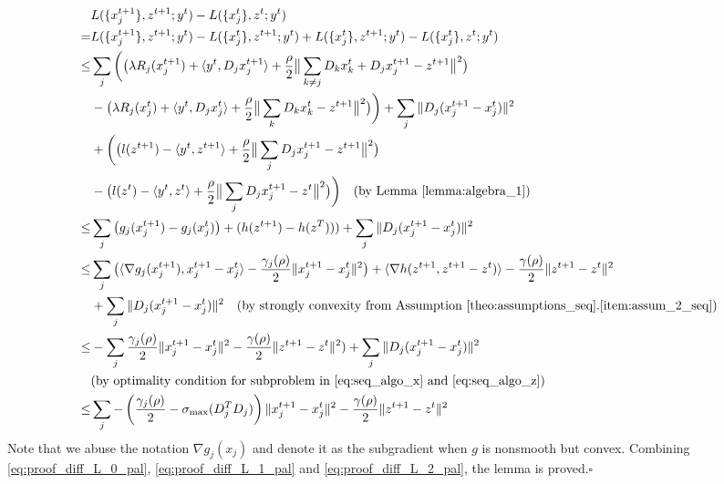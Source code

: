 \begin{align}
    & L(\{x_j^{t+1}\},z^{t+1};y^{t}) - L(\{x_j^{t}\},z^{t};y^{t})\nonumber\\
    = & L(\{x_j^{t+1}\},z^{t+1};y^{t}) - L(\{x_j^{t}\},z^{t+1};y^{t}) + L(\{x_j^{t}\},z^{t+1};y^{t}) - L(\{x_j^{t}\},z^{t};y^{t})\nonumber\\
    \le & \sum_j\bigg(\big(\lambda R_j(x_j^{t+1}) + \langle y^t, D_jx_j^{t+1}\rangle + \frac{\rho}{2}\big\|\sum_{k\neq j}D_kx_k^{t} + D_jx_j^{t+1} - z^{t+1}\big\|^2\big)\nonumber\\
    & - \big(\lambda R_j(x_j^{t}) + \langle y^t, D_jx_j^{t}\rangle + \frac{\rho}{2}\big\|\sum_{k}D_kx_k^{t} - z^{t+1}\big\|^2\big)\bigg)+\sum_j\|D_j(x_j^{t+1} - x_j^t)\|^2\nonumber\\
    & + \bigg(\big(l(z^{t+1}) -\langle y^t, z^{t+1}\rangle + \frac{\rho}{2} \big\|\sum_jD_jx_j^{t+1} - z^{t+1}\big\|^2\big)\nonumber\\
    & -\big(l(z^{t}) -\langle y^t, z^{t}\rangle+ \frac{\rho}{2} \big\|\sum_jD_jx_j^{t+1} - z^{t}\big\|^2\big)\bigg)\quad\text{(by Lemma~\ref{lemma:algebra_1})}\\
    \le & \sum_j\big(g_j(x_j^{t+1}) - g_j(x_j^t)\big) + (h(z^{t+1}) - h(z^T)))+\sum_j\|D_j(x_j^{t+1} - x_j^t)\|^2\nonumber\\
    \le & \sum_j \big(\langle \nabla g_j(x_j^{t+1}), x_j^{t+1}-x_j^t\rangle - \frac{\gamma_j(\rho)}{2}\|x_j^{t+1}-x_j^t\|^2\big) + \langle\nabla h(z^{t+1}, z^{t+1} - z^t)\rangle - \frac{\gamma(\rho)}{2}\|z^{t+1} - z^t\|^2\nonumber\\
    & +\sum_j\|D_j(x_j^{t+1} - x_j^t)\|^2\quad\text{(by strongly convexity from Assumption~\ref{theo:assumptions_seq}.\ref{item:assum_2_seq})}\nonumber\\
    \le & -\sum_j\frac{\gamma_j(\rho)}{2}\|x_j^{t+1}-x_j^t\|^2 - \frac{\gamma(\rho)}{2}\|z^{t+1} - z^t\|^2)+\sum_j\|D_j(x_j^{t+1} - x_j^t)\|^2\nonumber\\
    & \text{(by optimality condition for subproblem in \eqref{eq:seq_algo_x} and \eqref{eq:seq_algo_z})}\nonumber\\
    \le & \sum_j -\left(\frac{\gamma_j(\rho)}{2}-\sigma_{\text{max}}(D_j^T D_j)\right)\|x_j^{t+1} - x_j^t\|^2 - \frac{\gamma(\rho)}{2}\|z^{t+1} - z^t\|^2\label{eq:proof_diff_L_2_pal}
\end{align}
Note that we abuse the notation $\nabla g_j(x_j)$ and denote it as the subgradient when $g$ is nonsmooth but convex. 
Combining \eqref{eq:proof_diff_L_0_pal}, \eqref{eq:proof_diff_L_1_pal} and \eqref{eq:proof_diff_L_2_pal}, the lemma is proved.\hfill$\square$

